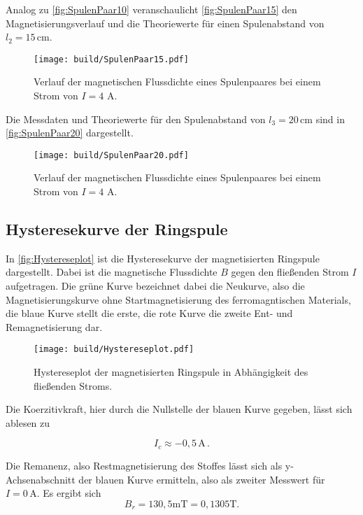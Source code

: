   Analog zu \autoref{fig:SpulenPaar10} veranschaulicht \autoref{fig:SpulenPaar15} den Magnetisierungsverlauf und die Theoriewerte
  für einen Spulenabstand von $l_2=15\, \unit{\centi\meter}$.
  \begin{figure}[H]
    \centering
    \texttt{[image: build/SpulenPaar15.pdf]}
    \caption{Verlauf der magnetischen Flussdichte eines Spulenpaares bei einem Strom von $I= 4 \, \, \unit{\ampere}$.}
    \label{fig:SpulenPaar15}
  \end{figure}

  Die Messdaten und Theoriewerte für den Spulenabstand von $l_3=20\, \unit{\centi\meter}$ sind in 
  \autoref{fig:SpulenPaar20} dargestellt.
  \begin{figure}[H]
    \centering
    \texttt{[image: build/SpulenPaar20.pdf]}
    \caption{Verlauf der magnetischen Flussdichte eines Spulenpaares bei einem Strom von $I= 4 \, \, \unit{\ampere}$.}
    \label{fig:SpulenPaar20}
  \end{figure}

\newpage

\subsection{Hysteresekurve der Ringspule}

In \autoref{fig:Hystereseplot} ist die Hysteresekurve der magnetisierten Ringspule dargestellt. Dabei ist die magnetische
Flussdichte $B$ gegen den fließenden Strom $I$ aufgetragen. Die grüne Kurve bezeichnet dabei die Neukurve, also die Magnetisierungskurve
ohne Startmagnetisierung des ferromagntischen Materials, die blaue Kurve stellt die erste, die rote Kurve die zweite Ent- und Remagnetisierung dar.

\begin{figure}[H]
    \centering
    \texttt{[image: build/Hystereseplot.pdf]}
    \caption{Hystereseplot der magnetisierten Ringspule in Abhängigkeit des fließenden Stroms.}
    \label{fig:Hystereseplot}
  \end{figure}

  Die Koerzitivkraft, hier durch die Nullstelle der blauen Kurve gegeben, lässt sich ablesen zu

  \begin{equation*}
    I_c \approx -0,5 \, \unit{\ampere} \,.
  \end{equation*}

  Die Remanenz, also Restmagnetisierung des Stoffes lässt sich als y-Achsenabschnitt der blauen Kurve ermitteln, also
  als zweiter Messwert für $I=0 \, \unit{\ampere}$.
  Es ergibt sich
  \begin{equation*}
    B_r = 130,5 \unit{\milli\tesla} = 0,1305 \unit{\tesla}. 
  \end{equation*}
